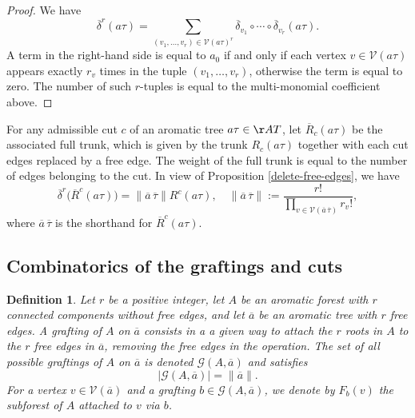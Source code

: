 \documentclass[a4paper,11pt]{article}
\newtheorem{definition}[theorem]{Definition}
\begin{document}
\begin{proof}
We have 
\[\overline{\delta}^r(a\tau)= \sum_{(v_1,\ldots, v_r)\in \mathcal V(a\tau)^r}\overline{\delta}_{v_1}\circ \cdots \circ \overline{\delta}_{v_r}(a\tau).\]
A term in the right-hand side is equal to $a_0$ if and only if each vertex $v\in \mathcal V(a\tau)$ appears exactly $r_v$ times in the tuple $(v_1,\ldots, v_r)$, otherwise the term is equal to zero. The number of such $r$-tuples is equal to the multi-monomial coefficient above.
\end{proof}


For any admissible cut $c$ of an aromatic tree $a\tau\in \AA T$, let $\overline{R}_{c}(a\tau)$ be the associated full trunk, which is given by the trunk $R_c(a\tau)$ together with each cut edges replaced by a free edge. The weight of the full trunk is equal to the number of edges belonging to the cut.
In view of Proposition \ref{delete-free-edges}, we have
\begin{equation}
\label{fulltrunk}
\overline{\delta}^r\big(\overline{R}^c(a\tau)\big)=\|\overline{a}\, \overline{\tau}\|R^c(a\tau), \quad
\|\overline{a}\, \overline{\tau}\|:= \frac{r!}{\prod_{v\in \mathcal V(\overline{a}\, \overline{\tau})}r_v!},
\end{equation}
where $\overline{a}\, \overline{\tau}$ is the shorthand for $\overline{R}^c(a\tau)$.









\subsection{Combinatorics of the graftings and cuts}

\begin{definition}\label{defngrafting}
 Let $r$ be a positive integer, let $A$ be an aromatic forest with $r$ connected components without free edges, and let $\overline{a}$ be an aromatic tree with $r$ free edges. A grafting of $A$ on $\overline{a}$ consists in a a given way to attach the $r$ roots in $A$ to the $r$ free edges in $\overline{a}$, removing the free edges in the operation. The set of all possible graftings of $A$ on $\overline{a}$ is denoted $\mathcal G(A,\overline{a})$ and satisfies 
 \begin{equation}\label{numgrafting}
 \vert \mathcal G(A,\overline{a})\vert= \|\overline{a}\|.   
 \end{equation}
 For a vertex $v\in \mathcal V(\overline{a})$ and a grafting $b\in \mathcal G(A, \overline{a})$, we denote by $F_b(v)$ the subforest of $A$ attached to $v$ via $b$.
\end{definition}
\end{document}
